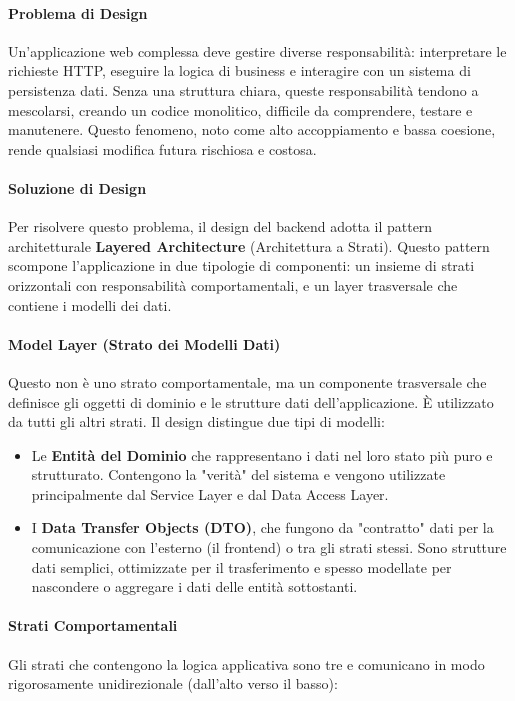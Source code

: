\documentclass[12pt,a4paper,openright,twoside]{book}
\begin{document}
\paragraph{Problema di Design}
Un'applicazione web complessa deve gestire diverse responsabilità: interpretare le richieste HTTP, eseguire la logica di business e interagire con un sistema di persistenza dati. Senza una struttura chiara, queste responsabilità tendono a mescolarsi, creando un codice monolitico, difficile da comprendere, testare e manutenere. Questo fenomeno, noto come alto accoppiamento e bassa coesione, rende qualsiasi modifica futura rischiosa e costosa.

\paragraph{Soluzione di Design}
Per risolvere questo problema, il design del backend adotta il pattern architetturale \textbf{Layered Architecture} (Architettura a Strati). Questo pattern scompone l'applicazione in due tipologie di componenti: un insieme di strati orizzontali con responsabilità comportamentali, e un layer trasversale che contiene i modelli dei dati.

\paragraph{Model Layer (Strato dei Modelli Dati)}
Questo non è uno strato comportamentale, ma un componente trasversale che definisce gli oggetti di dominio e le strutture dati dell'applicazione. È utilizzato da tutti gli altri strati. Il design distingue due tipi di modelli:
\begin{itemize}
    \item Le \textbf{Entità del Dominio} che rappresentano i dati nel loro stato più puro e strutturato. Contengono la "verità" del sistema e vengono utilizzate principalmente dal Service Layer e dal Data Access Layer.
    \item I \textbf{Data Transfer Objects (DTO)}, che fungono da "contratto" dati per la comunicazione con l'esterno (il frontend) o tra gli strati stessi. Sono strutture dati semplici, ottimizzate per il trasferimento e spesso modellate per nascondere o aggregare i dati delle entità sottostanti.
\end{itemize}

\paragraph{Strati Comportamentali}
Gli strati che contengono la logica applicativa sono tre e comunicano in modo rigorosamente unidirezionale (dall'alto verso il basso):
\end{document}
